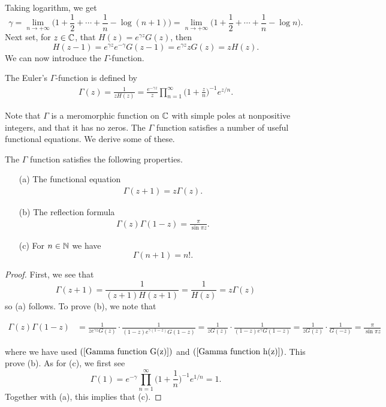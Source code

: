 Taking logarithm, we get
\[\gamma=\lim_{n\to+\infty}\Big(1+\frac{1}{2}+\cdots+\frac{1}{n}-\log(n+1)\Big)=\lim_{n\to+\infty}\Big(1+\frac{1}{2}+\cdots+\frac{1}{n}-\log n\Big).\]
Next set, for $z\in\mathbb{C}$, that $H(z)=e^{\gamma z}G(z)$, then
\[H(z-1)=e^{\gamma z}e^{-\gamma}G(z-1)=e^{\gamma z}zG(z)=zH(z).\]
We can now introduce the $\Gamma$-function.
\begin{definition}
The Euler's $\Gamma$-function is defined by
\begin{align}\label{Gamma function product form}
\Gamma(z)=\frac{1}{zH(z)}=\frac{e^{-\gamma z}}{z}\prod_{n=1}^{\infty}\Big(1+\frac{z}{n}\Big)^{-1}e^{z/n}.
\end{align}
\end{definition}
Note that $\Gamma$ is a meromorphic function on $\mathbb{C}$ with simple poles at nonpositive integers, and that it has no zeros. The $\Gamma$ function satisfies a number of useful functional equations. We derive some of these.\begin{proposition}
The $\Gamma$ function satisfies the following properties.
\begin{itemize}
\item[(a)] The functional equation
\begin{align}\label{Gamma function functional equation}
\Gamma(z+1)=z\Gamma(z).
\end{align}
\item[(b)] The reflection formula
\begin{align}\label{Gamma function reflection formula}
\Gamma(z)\Gamma(1-z)=\frac{\pi}{\sin\pi z}.
\end{align}
\item[(c)] For $n\in\mathbb{N}$ we have
\[\Gamma(n+1)=n!.\] 
\end{itemize}
\end{proposition}
\begin{proof}
First, we see that
\[\Gamma(z+1)=\frac{1}{(z+1)H(z+1)}=\frac{1}{H(z)}=z\Gamma(z)\]
so (a) follows. To prove (b), we note that
\begin{small}
\begin{align*}
\Gamma(z)\Gamma(1-z)&=\frac{1}{ze^{\gamma z}G(z)}\cdot\frac{1}{(1-z)e^{\gamma(1-z)}G(1-z)}=\frac{1}{zG(z)}\cdot\frac{1}{(1-z)e^{\gamma}G(1-z)}=\frac{1}{zG(z)}\cdot\frac{1}{G(-z)}=\frac{\pi}{\sin\pi z}
\end{align*}
\end{small}
where we have used $(\ref{Gamma function G(z)})$ and $(\ref{Gamma function h(z)})$. This prove (b). As for (c), we first see
\[\Gamma(1)=e^{-\gamma}\prod_{n=1}^{\infty}\Big(1+\frac{1}{n}\Big)^{-1}e^{1/n}=1.\]
Together with (a), this implies that (c).
\end{proof}
